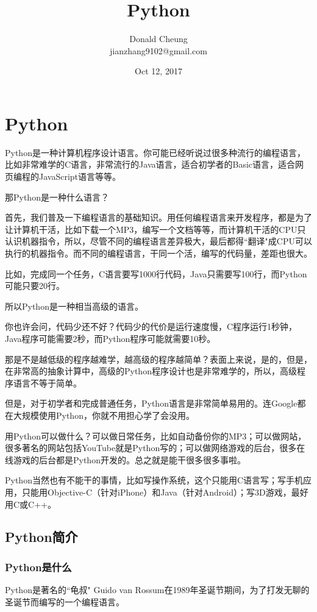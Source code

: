 \documentclass[10pt,a4paper]{ctexbook}
\begin{document}
    \setlength{\baselineskip}{20pt}
    \title{Python}
    \author{Donald Cheung\\jianzhang9102@gmail.com}
    \date{Oct 12, 2017}
    \tableofcontents
\fi

\chapter{Python}
Python是一种计算机程序设计语言。你可能已经听说过很多种流行的编程语言，比如非常难学的C语言，非常流行的Java语言，适合初学者的Basic语言，适合网页编程的JavaScript语言等等。

那Python是一种什么语言？

首先，我们普及一下编程语言的基础知识。用任何编程语言来开发程序，都是为了让计算机干活，比如下载一个MP3，编写一个文档等等，而计算机干活的CPU只认识机器指令，所以，尽管不同的编程语言差异极大，最后都得``翻译"成CPU可以执行的机器指令。而不同的编程语言，干同一个活，编写的代码量，差距也很大。

比如，完成同一个任务，C语言要写1000行代码，Java只需要写100行，而Python可能只要20行。

所以Python是一种相当高级的语言。

你也许会问，代码少还不好？代码少的代价是运行速度慢，C程序运行1秒钟，Java程序可能需要2秒，而Python程序可能就需要10秒。

那是不是越低级的程序越难学，越高级的程序越简单？表面上来说，是的，但是，在非常高的抽象计算中，高级的Python程序设计也是非常难学的，所以，高级程序语言不等于简单。

但是，对于初学者和完成普通任务，Python语言是非常简单易用的。连Google都在大规模使用Python，你就不用担心学了会没用。

用Python可以做什么？可以做日常任务，比如自动备份你的MP3；可以做网站，很多著名的网站包括YouTube就是Python写的；可以做网络游戏的后台，很多在线游戏的后台都是Python开发的。总之就是能干很多很多事啦。

Python当然也有不能干的事情，比如写操作系统，这个只能用C语言写；写手机应用，只能用Objective-C（针对iPhone）和Java（针对Android）；写3D游戏，最好用C或C++。

\section{Python简介}
\subsection{Python是什么}
Python是著名的``龟叔" Guido van Rossum在1989年圣诞节期间，为了打发无聊的圣诞节而编写的一个编程语言。
\end{document}
